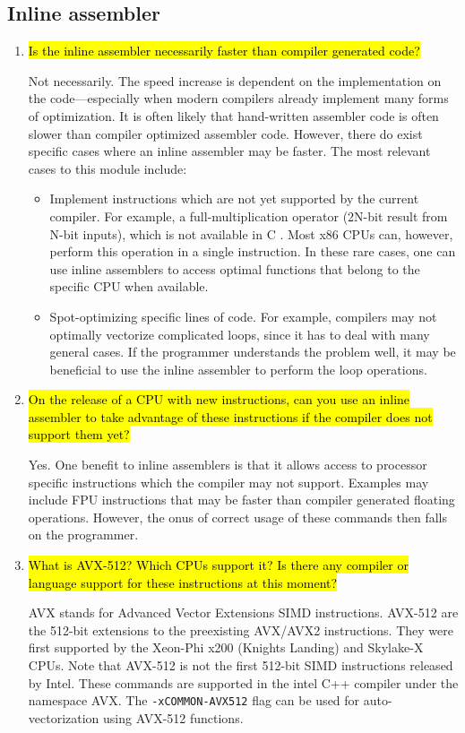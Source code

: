 \documentclass{article}
\begin{document}
\subsection{Inline assembler}
\begin{enumerate}
	\item \hl{Is the inline assembler necessarily faster than compiler generated code?}

	Not necessarily. The speed increase is dependent on the implementation on the code---especially when modern compilers already implement many forms of optimization. It is often likely that hand-written assembler code is often slower than compiler optimized assembler code. However, there do exist specific cases where an inline assembler may be faster. The most relevant cases to this module include:
	\begin{itemize}
		\item Implement instructions which are not yet supported by the current compiler. For example, a full-multiplication operator (2N-bit result from N-bit inputs), which is not available in C . Most x86 CPUs can, however, perform this operation in a single instruction. In these rare cases, one can use inline assemblers to access optimal functions that belong to the specific CPU when available.

		\item Spot-optimizing specific lines of code. For example, compilers may not optimally vectorize complicated loops, since it has to deal with many general cases. If the programmer understands the problem well, it may be beneficial to use the inline assembler to perform the loop operations.
	\end{itemize}
	
	\item \hl{On the release of a CPU with new instructions, can you use an inline assembler to take advantage of these instructions if the compiler does not support them yet?}

	Yes. One benefit to inline assemblers is that it allows access to processor specific instructions which the compiler may not support. Examples may include FPU instructions that may be faster than compiler generated floating operations. However, the onus of correct usage of these commands then falls on the programmer.
	
	\item \hl{What is AVX-512? Which CPUs support it? Is there any compiler or language support for these instructions at this moment?}

	AVX stands for Advanced Vector Extensions SIMD instructions. AVX-512 are the 512-bit extensions to the preexisting AVX/AVX2 instructions. They were first supported by the Xeon-Phi x200 (Knights Landing) and Skylake-X CPUs. Note that AVX-512 is not the first 512-bit SIMD instructions released by Intel. These commands are supported in the intel C++ compiler under the namespace AVX. The \verb!-xCOMMON-AVX512! flag can be used for auto-vectorization using AVX-512 functions.
\end{enumerate}
\end{document}
